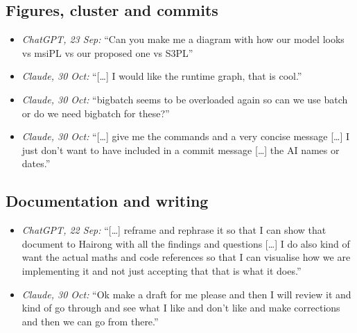 \subsection*{Figures, cluster and commits}
\begin{itemize}
  \item \emph{ChatGPT, 23 Sep:} ``Can you make me a diagram with how our model
        looks vs msiPL vs our proposed one vs S3PL''
  \item \emph{Claude, 30 Oct:} ``[\ldots] I would like the runtime graph, that is
        cool.''
  \item \emph{Claude, 30 Oct:} ``bigbatch seems to be overloaded again so can we
        use batch or do we need bigbatch for these?''
  \item \emph{Claude, 30 Oct:} ``[\ldots] give me the commands and a very
        concise message [\ldots] I just don't want to have included in a commit
        message [\ldots] the AI names or dates.''
\end{itemize}

\subsection*{Documentation and writing}
\begin{itemize}
  \item \emph{ChatGPT, 22 Sep:} ``[\ldots] reframe and rephrase it so that I can
        show that document to Hairong with all the findings and questions
        [\ldots] I do also kind of want the actual maths and code references so
        that I can visualise how we are implementing it and not just accepting
        that that is what it does.''
  \item \emph{Claude, 30 Oct:} ``Ok make a draft for me please and then I will
        review it and kind of go through and see what I like and don't like and
        make corrections and then we can go from there.''
\end{itemize}
